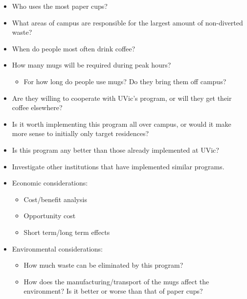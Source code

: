 \documentclass[letterpaper,11pt]{texMemo}
\begin{document}
\begin{itemize}
	\item Who uses the most paper cups?
	\item What areas of campus are responsible for the largest amount of
		non-diverted waste?\\

	\item When do people most often drink coffee?
	\item How many mugs will be required during peak hours?
	\begin{itemize}
		\item For how long do people use mugs? Do they bring them off campus?
	\end{itemize}
	\item Are they willing to cooperate with UVic's program, or will they
		get their coffee elsewhere?\\

	\item Is it worth implementing this program all over campus, or would it
		make more sense to initially only target residences?
	\item Is this program any better than those already implemented at UVic?
	\item Investigate other institutions that have implemented similar
		programs.\\

	\item Economic considerations:
	\begin{itemize}
		\item Cost/benefit analysis
		\item Opportunity cost
		\item Short term/long term effects
	\end{itemize}
	\item Environmental considerations:
	\begin{itemize}
		\item How much waste can be eliminated by this program?
		\item How does the manufacturing/transport of the mugs affect the
			environment? Is it better or worse than that of paper cups?
	\end{itemize}

\end{itemize}
\end{document}
